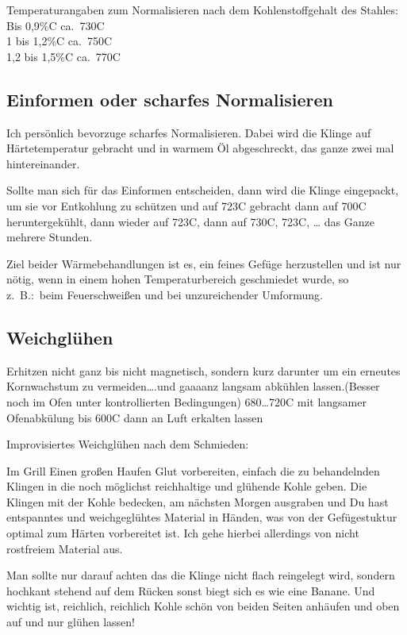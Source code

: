 \documentclass[a4paper]{scrartcl} %
\begin{document}
Temperaturangaben zum Normalisieren nach dem Kohlenstoffgehalt des Stahles:\\
Bis 0,9\%C ca.\  730{\degree}C\\
1 bis 1,2\%C ca.\  750{\degree}C\\
1,2 bis 1,5\%C ca.\  770{\degree}C

\subsection{Einformen oder scharfes Normalisieren}
Ich persönlich bevorzuge scharfes Normalisieren. Dabei wird die Klinge auf Härtetemperatur gebracht und in warmem Öl abgeschreckt, das ganze zwei mal hintereinander.

Sollte man sich für das Einformen entscheiden, dann wird die Klinge eingepackt, um sie vor Entkohlung zu schützen und auf 723{\degree}C gebracht dann auf 700{\degree}C heruntergekühlt, dann wieder auf 723{\degree}C, dann auf 730{\degree}C, 723{\degree}C, {\ldots} das Ganze mehrere Stunden.

Ziel beider Wärmebehandlungen ist es, ein feines Gefüge herzustellen und ist nur nötig, wenn in einem hohen Temperaturbereich geschmiedet wurde, so z.\ B.:\ beim Feuerschweißen und bei unzureichender Umformung.

\subsection{Weichglühen}
Erhitzen nicht ganz bis nicht magnetisch, sondern kurz darunter um ein erneutes Kornwachstum zu vermeiden{\ldots}.und gaaaanz langsam abkühlen lassen.(Besser noch im Ofen unter kontrollierten Bedingungen) 680{\ldots}720{\degree}C mit langsamer Ofenabkülung bis 600{\degree}C dann an Luft erkalten lassen

Improvisiertes Weichglühen nach dem Schmieden:

Im Grill Einen großen Haufen Glut vorbereiten, einfach die zu behandelnden Klingen in die noch möglichst reichhaltige und glühende Kohle geben. Die Klingen mit der Kohle bedecken, am nächsten Morgen ausgraben und Du hast entspanntes und weichgeglühtes Material in Händen, was von der Gefügestuktur optimal zum Härten vorbereitet ist. Ich gehe hierbei allerdings von nicht rostfreiem Material aus.

Man sollte nur darauf achten das die Klinge nicht flach reingelegt wird, sondern hochkant stehend auf dem Rücken sonst biegt sich es wie eine Banane.
Und wichtig ist, reichlich, reichlich Kohle schön von beiden Seiten anhäufen und oben auf und nur glühen lassen!
\end{document}
